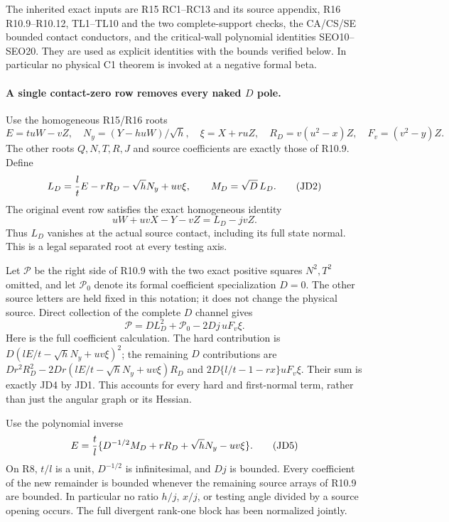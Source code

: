 The inherited exact inputs are R15 RC1--RC13 and its source appendix,
R16 R10.9--R10.12, TL1--TL10 and the two complete-support checks, the
CA/CS/SE bounded contact conductors, and the critical-wall polynomial
identities SEO10--SEO20.  They are used as explicit identities with
the bounds verified below.  In particular no physical C1 theorem is
invoked at a negative formal beta.

\paragraph{A single contact-zero row removes every naked $D$ pole.}
Use the homogeneous R15/R16 roots
\[
 E=tuW-vZ,\quad N_y=(Y-huW)/\sqrt h,\quad \xi=X+ruZ,
 \quad R_D=v(u^2-x)Z,\quad F_v=(v^2-y)Z.
\]
The other roots $Q,N,T,R,J$ and source coefficients are exactly those
of R10.9.  Define
\[
 L_D={l\over t}E-rR_D-\sqrt hN_y+uv\xi,
 \qquad M_D=\sqrt D\,L_D.                            \tag{JD2}
\]
The original event row satisfies the exact homogeneous identity
\[
 uW+uvX-Y-vZ=L_D-jvZ.                               \tag{JD3}
\]
Thus $L_D$ vanishes at the actual source contact, including its full
state normal.  This is a legal separated root at every testing axis.

Let $\mathscr P$ be the right side of R10.9 with the two exact
positive squares $N^2,T^2$ omitted, and let $\mathscr P_0$ denote
its formal coefficient specialization $D=0$.  The other source
letters are held fixed in this notation; it does not change the
physical source.  Direct collection of the complete $D$ channel gives
\[
 \boxed{\quad \mathscr P=D L_D^2+\mathscr P_0
                        -2Dj\,uF_v\xi.\quad}        \tag{JD4}
\]
Here is the full coefficient calculation.  The hard contribution is
$D(lE/t-\sqrt hN_y+uv\xi)^2$; the remaining $D$ contributions are
$Dr^2R_D^2-2Dr(lE/t-\sqrt hN_y+uv\xi)R_D$ and
$2D\{l/t-1-rx\}uF_v\xi$.  Their sum is exactly JD4 by JD1.
This accounts for every hard and first-normal term, rather than just
the angular graph or its Hessian.

Use the polynomial inverse
\[
 E={t\over l}\{D^{-1/2}M_D+rR_D+\sqrt hN_y-uv\xi\}. \tag{JD5}
\]
On R8, $t/l$ is a unit, $D^{-1/2}$ is infinitesimal, and $Dj$ is
bounded.  Every coefficient of the new remainder is bounded whenever
the remaining source arrays of R10.9 are bounded.  In particular no
ratio $h/j$, $x/j$, or testing angle divided by a source opening occurs.
The full divergent rank-one block has been normalized jointly.

